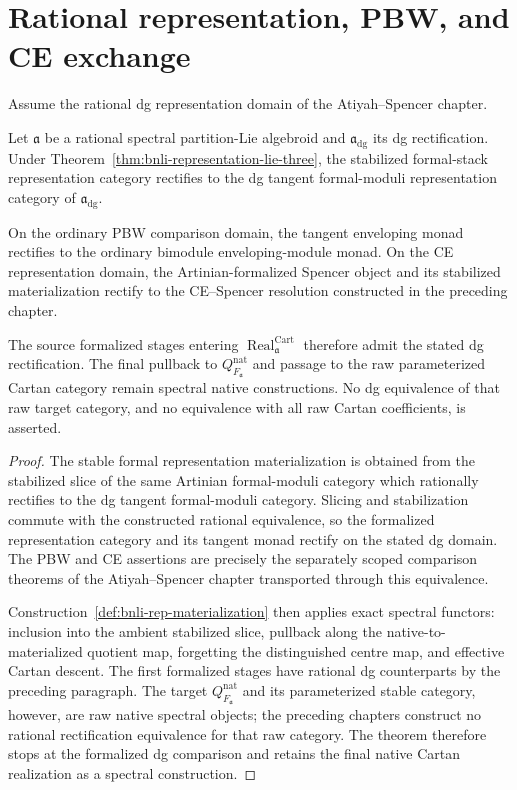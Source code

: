 \section{Rational representation, PBW, and CE exchange}
\label{sec:bnli-rational-representation-exchange}

Assume the rational dg representation domain of the Atiyah--Spencer chapter.

\begin{theorem}
\label{thm:bnli-rational-rep-comparison}
Let $\mathfrak a$ be a rational spectral partition-Lie algebroid and
$\mathfrak a_{\mathrm{dg}}$ its dg rectification.  Under
Theorem~\ref{thm:bnli-representation-lie-three}, the stabilized formal-stack
representation category rectifies to the dg tangent formal-moduli
representation category of $\mathfrak a_{\mathrm{dg}}$.

On the ordinary PBW comparison domain, the tangent enveloping monad rectifies
to the ordinary bimodule enveloping-module monad.  On the CE representation
domain, the Artinian-formalized Spencer object and its stabilized
materialization rectify to the CE--Spencer resolution constructed in the
preceding chapter.

The source formalized stages entering
$\operatorname{Real}^{\mathrm{Cart}}_{\mathfrak a}$ therefore admit the stated
dg rectification.  The final pullback to
$Q^{\mathrm{nat}}_{F_{\mathfrak a}}$ and passage to the raw parameterized
Cartan category remain spectral native constructions.  No dg equivalence of
that raw target category, and no equivalence with all raw Cartan
coefficients, is asserted.
\end{theorem}

\begin{proof}
The stable formal representation materialization is obtained from the
stabilized slice of the same Artinian formal-moduli category which rationally
rectifies to the dg tangent formal-moduli category.  Slicing and stabilization
commute with the constructed rational equivalence, so the formalized
representation category and its tangent monad rectify on the stated dg
domain.  The PBW and CE assertions are precisely the separately scoped
comparison theorems of the Atiyah--Spencer chapter transported through this
equivalence.

Construction~\ref{def:bnli-rep-materialization} then applies exact spectral
functors: inclusion into the ambient stabilized slice, pullback along the
native-to-materialized quotient map, forgetting the distinguished centre map,
and effective Cartan descent.  The first formalized stages have rational dg
counterparts by the preceding paragraph.  The target
$Q^{\mathrm{nat}}_{F_{\mathfrak a}}$ and its parameterized stable category,
however, are raw native spectral objects; the preceding chapters construct no
rational rectification equivalence for that raw category.  The theorem
therefore stops at the formalized dg comparison and retains the final native
Cartan realization as a spectral construction.
\end{proof}


